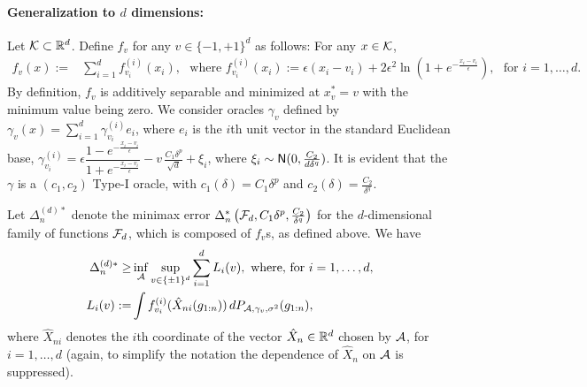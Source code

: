 \paragraph{Generalization to $d$ dimensions:}

Let $\mathcal{K} \subset \mathbb{R}^d$.
Define $f_v$ for any $v\in \{-1,+1\}^d$ as follows: For any $x \in \mathcal{K}$, 
\begin{align*}
  f_v(x) :=& \sum_{i=1}^d f^{(i)}_{v_i}(x_i), \,\,  \text{ where }
  f^{(i)}_{v_i}(x_i) := \epsilon\left( x_i-v_i\right)+2\epsilon^2 \ln\left(1+e^{-\frac{x_i-v_i}{\epsilon}}  \right),  \,\, \text{ for } i=1,\ldots,d.
\end{align*}
By definition, $f_v$ is additively separable and minimized at $x^*_v=v$ with the minimum value being zero.
We consider oracles $\gamma_v$ defined by
$\gamma_v(x) = \sum_{i=1}^d \gamma_{v_i}^{(i)}e_i$, where 
$e_i$ is the $i$th unit vector in the standard Euclidean base,
$\gamma_{v_i}^{(i)} = 
\epsilon \dfrac{1-e^{-\frac{x_i-v_i}{\epsilon}}}{1+e^{-\frac{x_i-v_i}{\epsilon}}} - v\, \frac{C_1 \delta^p}{\sqrt{d}}  + \xi_i
$, where $\xi_i \sim \mathsf{N}(0,\frac{C_2}{d\delta^q})$. 
It is evident that the $\gamma$ is a $(c_1,c_2)$ Type-I oracle, with $c_1(\delta)=C_1\delta^p$ and $c_2(\delta)=\frac{C_2}{\delta^q}$.

Let $\Delta_n^{(d)*}$ denote the minimax error $\Delta_n^*\left(\mathcal{F}_d, C_1\delta^p,\frac{C_2}{\delta^q}\right)$ for the $d$-dimensional family of functions $\mathcal{F}_d$, which is composed of $f_v$s, as defined above. We have
\begin{align*}
 \Delta_n^{(d)*} \ge& \inf_{\mathcal{A}}  \sup_{v\in \{\pm 1 \}^d}\sum_{i=1}^d L_i(v), \text{ where, for } i=1,\ldots,d,\\
 L_i(v) := & \int f^{(i)}_{v_i}(\hat X_{ni}(g_{1:n}) )\, dP_{\mathcal{A},\gamma_v,\sigma^2}(g_{1:n}),  
\end{align*}
where $\hat{X}_{ni}$ denotes the $i$th coordinate of the vector $\hat{X}_n \in \mathbb{R}^d$ chosen by $\mathcal{A}$, for $i=1,\ldots,d$
(again, to simplify the notation the dependence of $\hat{X}_n$ on $\mathcal{A}$ is suppressed).



